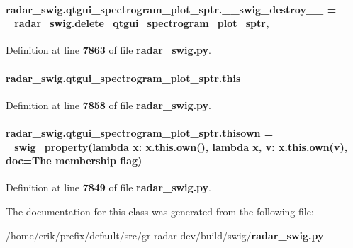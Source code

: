 \paragraph[{\+\_\+\+\_\+swig\+\_\+destroy\+\_\+\+\_\+}]{\setlength{\rightskip}{0pt plus 5cm}radar\+\_\+swig.\+qtgui\+\_\+spectrogram\+\_\+plot\+\_\+sptr.\+\_\+\+\_\+swig\+\_\+destroy\+\_\+\+\_\+ = \+\_\+radar\+\_\+swig.\+delete\+\_\+qtgui\+\_\+spectrogram\+\_\+plot\+\_\+sptr\hspace{0.3cm}{\ttfamily [static]}, {\ttfamily [private]}}\label{classradar__swig_1_1qtgui__spectrogram__plot__sptr_ac37d389db75afa24b94d629a538c2e50}


Definition at line {\bf 7863} of file {\bf radar\+\_\+swig.\+py}.

\paragraph[{this}]{\setlength{\rightskip}{0pt plus 5cm}radar\+\_\+swig.\+qtgui\+\_\+spectrogram\+\_\+plot\+\_\+sptr.\+this}\label{classradar__swig_1_1qtgui__spectrogram__plot__sptr_a5038590609086b47e2c26c7126700fa5}


Definition at line {\bf 7858} of file {\bf radar\+\_\+swig.\+py}.

\paragraph[{thisown}]{\setlength{\rightskip}{0pt plus 5cm}radar\+\_\+swig.\+qtgui\+\_\+spectrogram\+\_\+plot\+\_\+sptr.\+thisown = {\bf \+\_\+swig\+\_\+property}(lambda x\+: x.\+this.\+own(), lambda {\bf x}, v\+: x.\+this.\+own(v), doc=\textquotesingle{}The membership flag\textquotesingle{})\hspace{0.3cm}{\ttfamily [static]}}\label{classradar__swig_1_1qtgui__spectrogram__plot__sptr_a153914e0b444fb8422eee48729586186}


Definition at line {\bf 7849} of file {\bf radar\+\_\+swig.\+py}.



The documentation for this class was generated from the following file\+:\begin{DoxyCompactItemize}
\item 
/home/erik/prefix/default/src/gr-\/radar-\/dev/build/swig/{\bf radar\+\_\+swig.\+py}\end{DoxyCompactItemize}
